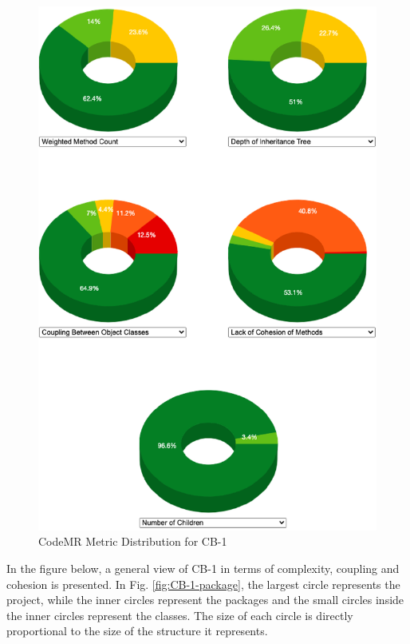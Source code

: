 \begin{figure}[ht!]
    \centering
    \includegraphics[scale=1]{figures/CB-1-donuts.png}
    \caption{CodeMR Metric Distribution for CB-1}
    \label{fig:CB-1-donuts}
\end{figure}
\FloatBarrier

In the figure below, a general view of CB-1 in terms of complexity, coupling and cohesion is presented. In Fig. \ref{fig:CB-1-package}, the largest circle represents the project, while the inner circles represent the packages and the small circles inside the inner circles represent the classes. The size of each circle is directly proportional to the size of the structure it represents.

